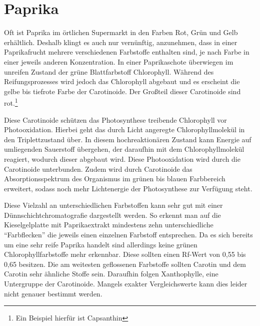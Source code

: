 \documentclass[11pt]{scrreprt}
\begin{document}
 

\section{Paprika}
Oft ist Paprika im örtlichen Supermarkt in den Farben Rot, Grün und Gelb erhältlich. Deshalb klingt es auch nur vernünftig, anzunehmen, dass in einer Paprikafrucht mehrere verschiedenen Farbstoffe enthalten sind, je nach Farbe in einer jeweils anderen Konzentration. In einer Paprikaschote überwiegen im unreifen Zustand der grüne Blattfarbstoff Chlorophyll. Während des Reifungsprozesses wird jedoch das Chlorophyll abgebaut und es erscheint die gelbe bis tiefrote Farbe der Carotinoide. Der Großteil dieser Carotinoide sind rot.\footnote{Ein Beispiel hierfür ist Capsanthin}


Diese Carotinoide schützen das Photosynthese treibende Chlorophyll vor Photooxidation. Hierbei geht das durch Licht angeregte Chlorophyllmolekül in den Triplettzustand über. In diesem hochreaktionären Zustand kann Energie auf umliegenden Sauerstoff übergehen, der daraufhin mit dem Chlorophyllmolekül reagiert, wodurch dieser abgebaut wird.
Diese Photooxidation wird durch die Carotinoide unterbunden.
Zudem wird durch Carotinoide das Absorptionsspektrum des Organismus im grünen bis blauen Farbbereich erweitert, sodass noch mehr Lichtenergie der Photosynthese zur Verfügung steht.

Diese Vielzahl an unterschiedlichen Farbstoffen kann sehr gut mit einer Dünnschichtchromatografie dargestellt werden. So erkennt man auf die Kieselgelplatte mit Paprikaextrakt mindestens zehn unterschiedliche \enquote{Farbflecken} die jeweils einen einzelnen Farbstoff entsprechen. Da es sich bereits um eine sehr reife Paprika handelt sind allerdings keine grünen Chlorophyllfarbstoffe mehr erkennbar. Diese sollten einen Rf-Wert von 0,55 bis 0,65 besitzen. Die am weitesten geflossenen Farbstoffe sollten Carotin und dem Carotin sehr ähnliche Stoffe sein. Daraufhin folgen Xanthophylle, eine Untergruppe der Carotinoide. 
Mangels exakter Vergleichswerte kann dies leider nicht genauer bestimmt werden. 
\end{document}
